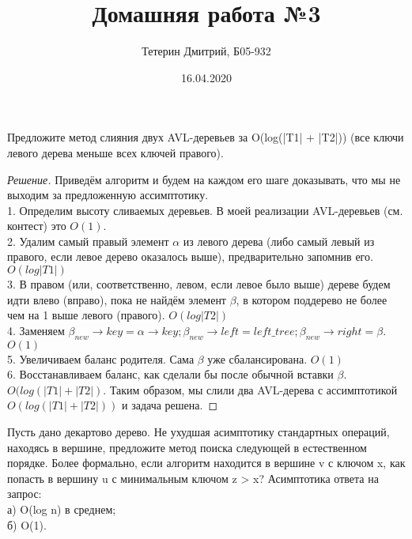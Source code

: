 \documentclass[12pt]{article}
\newenvironment{problem}[2][Задача]{\begin{trivlist}
\item[\hskip \labelsep {\bfseries #1}\hskip \labelsep {\bfseries #2.}]}{\end{trivlist}}
\newenvironment{solution}[0]{\begin{proof}[Решение]}{\end{proof}}
\begin{document}
 
 
\title{Домашняя работа №3}
\author{Тетерин Дмитрий, Б05-932}
\date{16.04.2020}
 
\maketitle



\begin{problem}{1}
    Предложите метод слияния двух AVL-деревьев за O(log(|T1| + |T2|)) (все ключи левого
дерева меньше всех ключей правого).
\end{problem}

\begin{solution}
    Приведём алгоритм и будем на каждом его шаге доказывать, что мы не выходим за предложенную ассимптотику.
    \\1. Определим высоту сливаемых деревьев. В моей реализации AVL-деревьев (см. контест) это $O(1)$. 
    \\2. Удалим самый правый элемент $\alpha$ из левого дерева (либо самый левый из правого, если левое дерево оказалось выше), предварительно запомнив его. $O(log |T1|)$
    \\3. В правом (или, соответственно, левом, если левое было выше) дереве будем идти влево (вправо), пока не найдём элемент $\beta$, в котором поддерево не более чем на 1 выше левого (правого). $O(log |T2|)$
    \\4. Заменяем $\beta_{new}\rightarrow key = \alpha\rightarrow key; \beta_{new}\rightarrow left = left\_tree; \beta_{new}\rightarrow right = \beta$. $O(1)$
    \\5. Увеличиваем баланс родителя. Сама $\beta$ уже сбалансирована. $O(1)$
    \\6. Восстанавливаем баланс, как сделали бы после обычной вставки $\beta$. $O(log (|T1| + |T2|)$.
    Таким образом, мы слили два AVL-дерева с ассимптотикой $O(log(|T1|+|T2|))$ и задача решена.
\end{solution}

\newpage
\begin{problem}{4}
    Пусть дано декартово дерево. Не ухудшая асимптотику стандартных операций, находясь в вершине,
предложите метод поиска следующей в естественном порядке. Более формально, если алгоритм находится в вершине v с ключом x, как попасть в вершину u с минимальным ключом z > x? Асимптотика
ответа на запрос:
\\а) O(log n) в среднем;
\\б) O(1).
\end{problem}
\end{document}
